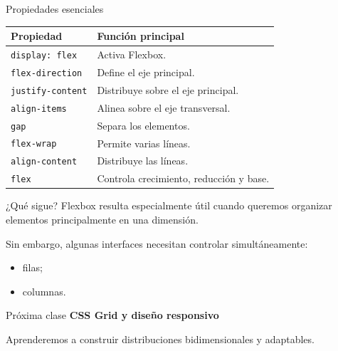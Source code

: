 \documentclass[aspectratio=169,11.5pt]{beamer}
\begin{document}
    \begin{frame}{Propiedades esenciales}
        \begin{center}
            \small
            \begin{tabular}{p{3.8cm}p{6cm}}
                \toprule
                \textbf{Propiedad} & \textbf{Función principal} \\
                \midrule

                \texttt{display: flex} &
                Activa Flexbox. \\

                \texttt{flex-direction} &
                Define el eje principal. \\

                \texttt{justify-content} &
                Distribuye sobre el eje principal. \\

                \texttt{align-items} &
                Alinea sobre el eje transversal. \\

                \texttt{gap} &
                Separa los elementos. \\

                \texttt{flex-wrap} &
                Permite varias líneas. \\

                \texttt{align-content} &
                Distribuye las líneas. \\

                \texttt{flex} &
                Controla crecimiento, reducción y base. \\

                \bottomrule
            \end{tabular}
        \end{center}
    \end{frame}

    \begin{frame}{¿Qué sigue?}
        Flexbox resulta especialmente útil
        cuando queremos organizar elementos
        principalmente en una dimensión.

        Sin embargo, algunas interfaces necesitan
        controlar simultáneamente:

        \begin{itemize}
            \item filas;
            \item columnas.
        \end{itemize}

        \begin{block}{Próxima clase}
            \textbf{CSS Grid y diseño responsivo}

            Aprenderemos a construir distribuciones
            bidimensionales y adaptables.
        \end{block}
    \end{frame}
\end{document}
